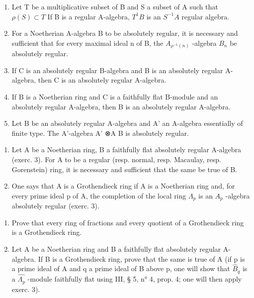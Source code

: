 \begin{enumerate}
\def\labelenumi{\alph{enumi})}
\item
  Let T be a multiplicative subset of B and S a subset of A such that \(\rho(S) \subset T\) If B is a regular A-algebra, \(T^{1}B\) is an \(S^{-1}A\) regular algebra.
\item
  For a Noetherian A-algebra B to be absolutely regular, it is necessary and sufficient that for every maximal ideal n of B, the \(A_{\rho^{-1}(n)}\) -algebra \(B_{n}\) be absolutely regular.
\item
  If C is an absolutely regular B-algebra and B is an absolutely regular A-algebra, then C is an absolutely regular A-algebra.
\item
  If B is a Noetherian ring and C is a faithfully flat B-module and an absolutely regular A-algebra, then B is an absolutely regular A-algebra.
\item
  Let B be an absolutely regular A-algebra and A' an A-algebra essentially of finite type. The A'-algebra A' ⊗A B is absolutely regular.
\end{enumerate}

\begin{enumerate}
\def\labelenumi{\arabic{enumi})}
\setcounter{enumi}{3}
\item
  Let A be a Noetherian ring, B a faithfully flat absolutely regular A-algebra (exerc. 3). For A to be a regular (resp. normal, resp. Macaulay, resp. Gorenstein) ring, it is necessary and sufficient that the same be true of B.
\item
  One says that A is a Grothendieck ring if A is a Noetherian ring and, for every prime ideal p of A, the completion of the local ring \(\Lambda_{p}\) is an \(A_{p}\) -algebra absolutely regular (exerc. 3).
\end{enumerate}

\begin{enumerate}
\def\labelenumi{\alph{enumi})}
\item
  Prove that every ring of fractions and every quotient of a Grothendieck ring is a Grothendieck ring.
\item
  Let A be a Noetherian ring and B a faithfully flat absolutely regular A-algebra. If B is a Grothendieck ring, prove that the same is true of A (if p is a prime ideal of A and q a prime ideal of B above p, one will show that \(\widehat{B}_{q}\) is a \(\widehat{\Lambda_{p}}\) -module faithfully flat using III, § 5, n° 4, prop. 4; one will then apply exerc. 3).
\end{enumerate}

